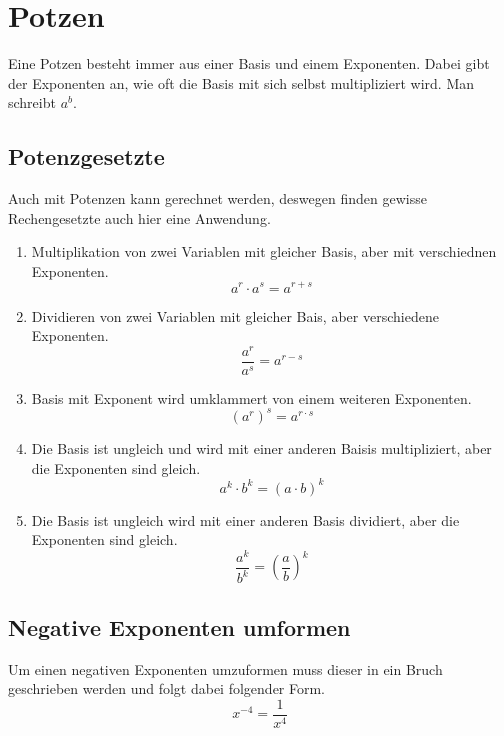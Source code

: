 \section{Potzen}\label{sec:Potenzen}
Eine Potzen besteht immer aus einer Basis und einem Exponenten. Dabei gibt der Exponenten an, wie oft die Basis mit sich selbst multipliziert wird. Man schreibt $a^b$. 
\subsection{Potenzgesetzte}\label{sec:Potenzen/Potenzgesetze}
 Auch mit Potenzen kann gerechnet werden, deswegen finden gewisse Rechengesetzte auch hier eine Anwendung.
\begin{enumerate}
	\item Multiplikation von zwei Variablen mit gleicher Basis, aber mit verschiednen Exponenten. \[a^r\cdot a^s=a^{r+s}\]
	\item Dividieren von zwei Variablen mit gleicher Bais, aber verschiedene Exponenten. \[\frac{a^r}{a^s}=a^{r-s}\]
	\item Basis mit Exponent wird umklammert von einem weiteren Exponenten. \[(a^r)^s=a^{r\cdot s}\]
	\item Die Basis ist ungleich und wird mit einer anderen Baisis multipliziert, aber die Exponenten sind gleich.\[a^k \cdot b^k =(a\cdot b)^k\]
	\item Die Basis ist ungleich wird mit einer anderen Basis dividiert, aber die Exponenten sind gleich. \[\frac{a^k}{b^k}=\left(\frac{a}{b}\right)^k\]
\end{enumerate}
\subsection{Negative Exponenten umformen}\label{sec:Potenzen/Negative Exponenten umformen}
Um einen negativen Exponenten umzuformen muss dieser in ein Bruch geschrieben werden und folgt dabei folgender Form. \[x^{-4}=\frac{1}{x^4}\]